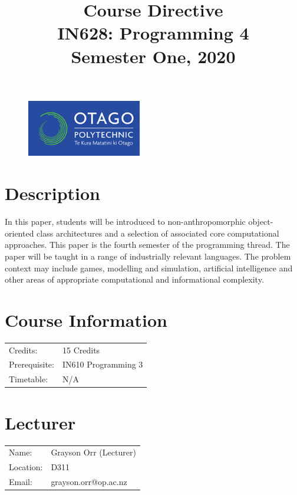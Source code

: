 \documentclass{article}
\author{}
\begin{document}
\begin{figure}
  \includegraphics[width=50mm]{../resources/img/logo.png}
\end{figure}

\title{Course Directive\\IN628: Programming 4\\Semester One, 2020}
\date{}
\maketitle

\section*{Description}
In this paper, students will be introduced to non-anthropomorphic object-oriented class architectures and a selection of associated core computational approaches. This paper is the fourth semester of the programming thread. The paper will be taught in a range of industrially relevant languages. The problem context may include games, modelling and simulation, artificial intelligence and other areas of appropriate computational and informational complexity.

\section*{Course Information}
\begin{tabular}{ll}
  Credits:      & 15 Credits          \\
  Prerequisite: & IN610 Programming 3 \\
  Timetable:    & N/A                 \\
\end{tabular}

\section*{Lecturer}
\begin{tabular}{ll}
  Name:     & Grayson Orr (Lecturer) \\
  Location: & D311                   \\
  Email:    & grayson.orr@op.ac.nz   \\
\end{tabular}
\end{document}
